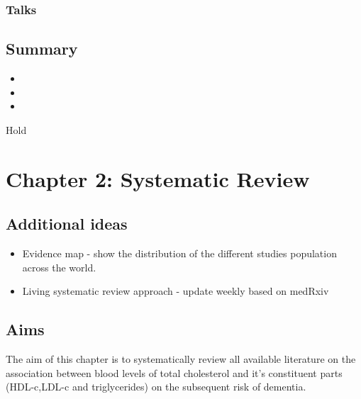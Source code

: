 \documentclass[a4paper, nobind]{templates/ociamthesis}
\providecommand{\tightlist}{%
  \setlength{\itemsep}{0pt}\setlength{\parskip}{0pt}}
\begin{document}
\hypertarget{talks}{%
\subsection{Talks}\label{talks}}

\hypertarget{summary}{%
\section{Summary}\label{summary}}

\begin{itemize}
\item
\item
\item
\end{itemize}

\begin{savequote}
Hold
\end{savequote}



\hypertarget{chapter-2-heading}{%
\chapter{Chapter 2: Systematic Review}\label{chapter-2-heading}}

\minitoc 

\hypertarget{additional-ideas}{%
\section{Additional ideas}\label{additional-ideas}}

\begin{itemize}
\tightlist
\item
  Evidence map - show the distribution of the different studies population across the world.
\item
  Living systematic review approach - update weekly based on medRxiv
\end{itemize}

\hypertarget{aims}{%
\section{Aims}\label{aims}}

The aim of this chapter is to systematically review all available literature on the association between blood levels of total cholesterol and it's constituent parts (HDL-c,LDL-c and triglycerides) on the subsequent risk of dementia.
\end{document}
